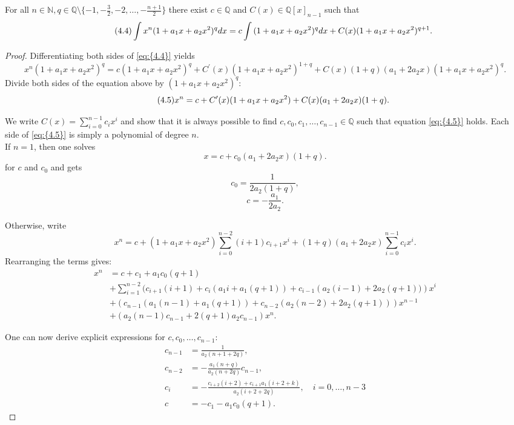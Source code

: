 \documentclass[10pt,a4paper]{amsart}
\begin{document}
\begin{lem}\label{lem:comb1}
For all $n \in \mathbb{N}, q\in\mathbb{Q}\setminus\{-1,-\frac{3}{2},-2,\ldots,-\frac{n+1}{2}\}$ there exist $c \in \mathbb{Q}$ and $ C(x) \in \mathbb{Q}[x]_{n-1}$ such that
\begin{equation}\label{eq:{4.4}}\tag{4.4}
\int{x^n (1+a_1x+a_2x^2)^q dx} = c\int{(1+a_1x+a_2x^2)^qdx} + C(x)(1+a_1x+a_2x^2)^{q+1}.
\end{equation}
\end{lem}

\begin{proof}
Differentiating both sides of \eqref{eq:{4.4}} yields
\[x^n (1+a_1x+a_2x^2)^q = c(1+a_1x+a_2x^2)^q+ C^\prime(x)(1+a_1x+a_2x^2)^{1+q} + C(x)(1+q)(a_1+2a_2x)(1+a_1x+a_2x^2)^{q}.\]
Divide both sides of the equation above by $(1+a_1x+a_2x^2)^q$:
\begin{equation} \label{eq:{4.5}}\tag{4.5}
x^n = c + C^\prime(x)(1+a_1x+a_2x^2) + C(x)(a_1+2a_2x)(1+q).
\end{equation}

We write $C(x) = \sum\limits_{i=0}^{n-1}c_ix^i$ and show that it is always possible to find $c, c_0, c_1, \ldots, c_{n-1} \in \mathbb{Q}$ such that equation \eqref{eq:{4.5}} holds. 
Each side of \eqref{eq:{4.5}} is simply a polynomial of degree $n$. \\
If $n=1$, then one solves
\[x = c + c_0(a_1+2a_2x)(1+q).\]
for $c$ and $c_0$ and gets
\[c_0 = \frac{1}{2a_2(1+q)},\]
\[c = -\frac{a_1}{2a_2}.\]

Otherwise, write
\[x^n = c + (1+a_1x+a_2x^2)\sum\limits_{i=0}^{n-2}(i+1)c_{i+1}x^{i} + (1+q)(a_1+2a_2x)\sum\limits_{i=0}^{n-1}c_ix^i.\]
Rearranging the terms gives:
\begin{align*}
x^n &= c + c_1 + a_1c_0(q+1)  \\
&+ \sum\limits_{i=1}^{n-2} (c_{i+1}(i+1) + c_i \left(a_1i + a_1(q+1)\right) + c_{i-1} \left(a_2(i-1) + 2a_2(q+1))\right)x^i \label{4.6}\tag{4.6}\\
&+ (c_{n-1}\left(a_1(n-1)+a_1(q+1)\right)+c_{n-2}\left(a_2(n-2) + 2a_2(q+1)\right))x^{n-1} \\
& + (a_2(n-1)c_{n-1}+2(q+1)a_2c_{n-1})x^n.
\end{align*}


One can now derive explicit expressions for $c,c_0,\ldots,c_{n-1}$:
\begin{align*}
c_{n-1} &= \frac{1}{a_2(n+1+2q)}, \\
c_{n-2} &= -\frac{a_1(n+q)}{a_2(n+2q)}c_{n-1}, \\
c_{i} &= -\frac{c_{i+2}(i+2) + c_{i+1}a_1\left(i + 2 + k\right)}{a_2(i + 2 + 2q)}, \quad i=0,\ldots,n-3 \\
c &= -c_1 - a_1c_0(q+1).
\end{align*}


\end{proof}
\end{document}
